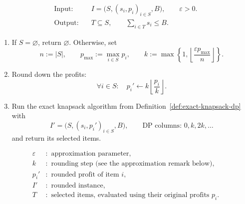 \documentclass[12pt,a4paper]{article}
\begin{document}
\begin{definition}
\[
\begin{aligned}
\text{Input:}\quad&I=\bigl(S,(s_i,p_i)_{i\in S},B\bigr),\qquad\varepsilon>0.\\[3pt]
\text{Output:}\quad&T\subseteq S,\qquad\sum_{i\in T}s_i\leq B.
\end{aligned}
\]
\begin{enumerate}
\item If $S=\varnothing$, return $\varnothing$. Otherwise, set
\[
n:=|S|,\qquad p_{\max}:=\max_{i\in S}p_i,\qquad
k:=\max\left\{1,\left\lfloor\frac{\varepsilon p_{\max}}n\right\rfloor\right\}.
\]
\item Round down the profits:
\[
\forall i\in S:\quad p_i'\leftarrow k\left\lfloor\frac{p_i}{k}\right\rfloor.
\]
\item Run the exact knapsack algorithm from Definition~\ref{def:exact-knapsack-dp} with
\[
I'=\bigl(S,(s_i,p_i')_{i\in S},B\bigr),\qquad
\text{DP columns: }0,k,2k,\ldots
\]
and return its selected items.
\end{enumerate}
\[
\begin{aligned}
\varepsilon&:\text{ approximation parameter},\\
k&:\text{ rounding step (see the }
\hyperref[rem:fptas-rounding]{\text{approximation remark below}}\text{)},\\
p_i'&:\text{ rounded profit of item }i,\\
I'&:\text{ rounded instance},\\
T&:\text{ selected items, evaluated using their original profits }p_i.
\end{aligned}
\]
\end{definition}
\end{document}
